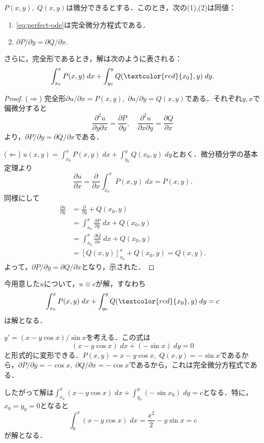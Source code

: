 \begin{theorem}
    $P(x,y), \; Q(x,y)$は微分できるとする．このとき，次の(1),(2)は同値：
    \begin{enumerate}
        \item \eqref{eq:perfect-ode}は完全微分方程式である．
        \item $\partial P/\partial y = \partial Q/\partial x.$
    \end{enumerate}
    さらに，完全形であるとき，解は次のように表される：
    \[ \int_{x_0}^{x} P(x,y) \; dx + \int_{y_0}^{y} Q(\textcolor{red}{x_0}, y) \; dy.\]
\end{theorem}
\begin{proof}
    ($\Rightarrow$) 完全形$\partial u/\partial x = P(x,y), \; \partial u/\partial y = Q(x,y)$である．それぞれ$y,x$で偏微分すると
    \[ \frac{\partial^2 u}{\partial y \partial x} = \frac{\partial P}{\partial y}, \quad \frac{\partial^2 u}{\partial x \partial y} = \frac{\partial Q}{\partial x}\]
    より，$\partial P/\partial y = \partial Q/\partial x$である．

    ($\Leftarrow$) $u(x,y) = \int_{x_0}^{x} P(x,y) \; dx + \int_{y_0}^{y} Q(x_0,y) \; dy$とおく．微分積分学の基本定理より
    \[ \frac{\partial u}{\partial x} = \frac{\partial}{\partial x} \int_{x_0}^{x} P(x,y) \; dx = P(x,y).\]
    同様にして
    \begin{align*}
        \frac{\partial u}{\partial y} &= \frac{\partial}{\partial y} + Q(x_0,y) \\
        &= \int_{x_0}^{x} \frac{\partial P}{\partial y} \; dx + Q(x_0,y) \\
        &= \int_{x_0}^{x} \frac{\partial Q}{\partial x} \; dx + Q(x_0,y) \\
        &= \left[Q(x,y)\right]_{x_0}^x + Q(x_0,y) = Q(x,y).
    \end{align*}
    よって，$\partial P/\partial y = \partial Q/\partial x$となり，示された．
\end{proof}

今用意した$u$について，$u \equiv c$が解，すなわち
\[ \int_{x_0}^{x} P(x,y) \; dx + \int_{y_0}^{y} Q(\textcolor{red}{x_0}, y) \; dy = c\]
は解となる．

\begin{example}
    $y' = (x - y\cos x)/\sin x$を考える．この式は
    \[ (x - y\cos x) \; dx + (-\sin x) \; dy = 0\]
    と形式的に変形できる．$P(x,y)=x - y\cos x, \; Q(x,y)=-\sin x$であるから，$\partial P/\partial y = -\cos x, \; \partial Q/\partial x = -\cos x$であるから，これは完全微分方程式である．

    したがって解は$\int_{x_0}^{x} (x-y\cos x) \; dx + \int_{y_0}^{y} (-\sin x_0) \; dy = c$となる．特に，$x_0=y_0=0$となると
    \[ \int_0^x (x-y\cos x) \; dx = \frac{x^2}{2} - y\sin x = c\]
    が解となる．
\end{example}

